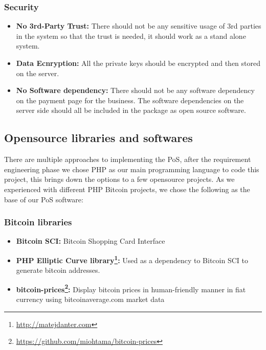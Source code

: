 \subsubsection{Security} 
\begin{itemize}

\item \textbf{No 3rd-Party Trust: } There should not be any sensitive usage of 3rd parties in the system so that the trust is needed, it should work as a stand alone system.

\item \textbf{Data Ecnryption: } All the private keys should be encrypted and then stored on the server. 

\item \textbf{No Software dependency: } There should not be any software dependency on the payment page for the business. The software dependencies on the server side should all be included in the package as open source software.

\end{itemize}



\subsection{Opensource libraries and softwares}
There are multiple approaches to implementing the PoS, after the requirement engineering phase we chose PHP as our main programming language to code this project, this brings down the options to a few opensource projects.
As we experienced with different PHP Bitcoin projects, we chose the following as the base of our PoS software:

\subsubsection{Bitcoin libraries}
\begin{itemize}

\item \textbf{Bitcoin SCI: }Bitcoin Shopping Card Interface
\item \textbf{PHP Elliptic Curve library\footnote{\url{http://matejdanter.com}}: } Used as a dependency to Bitcoin SCI to generate bitcoin addresses.
\item \textbf{bitcoin-prices\footnote{\url{https://github.com/miohtama/bitcoin-prices}}: } Display bitcoin prices in human-friendly manner in fiat currency using bitcoinaverage.com market data

\end{itemize}

